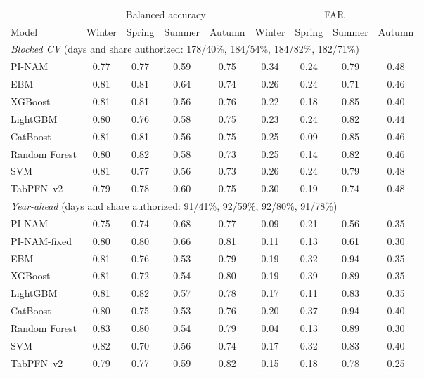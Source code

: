 \begin{tabular}{lcccccccc}
\toprule
 & \multicolumn{4}{c}{Balanced accuracy} & \multicolumn{4}{c}{FAR} \\
\cmidrule(lr){2-5}\cmidrule(lr){6-9}
Model & Winter & Spring & Summer & Autumn & Winter & Spring & Summer & Autumn \\
\midrule
\multicolumn{9}{l}{\textit{Blocked CV} (days and share authorized: 178/40\%, 184/54\%, 184/82\%, 182/71\%)} \\
PI-NAM & 0.77 & 0.77 & 0.59 & 0.75 & 0.34 & 0.24 & 0.79 & 0.48 \\
EBM & 0.81 & 0.81 & 0.64 & 0.74 & 0.26 & 0.24 & 0.71 & 0.46 \\
XGBoost & 0.81 & 0.81 & 0.56 & 0.76 & 0.22 & 0.18 & 0.85 & 0.40 \\
LightGBM & 0.80 & 0.76 & 0.58 & 0.75 & 0.23 & 0.24 & 0.82 & 0.44 \\
CatBoost & 0.81 & 0.81 & 0.56 & 0.75 & 0.25 & 0.09 & 0.85 & 0.46 \\
Random Forest & 0.80 & 0.82 & 0.58 & 0.73 & 0.25 & 0.14 & 0.82 & 0.46 \\
SVM & 0.81 & 0.77 & 0.56 & 0.73 & 0.26 & 0.24 & 0.79 & 0.48 \\
TabPFN~v2 & 0.79 & 0.78 & 0.60 & 0.75 & 0.30 & 0.19 & 0.74 & 0.48 \\
\multicolumn{9}{l}{\textit{Year-ahead} (days and share authorized: 91/41\%, 92/59\%, 92/80\%, 91/78\%)} \\
PI-NAM & 0.75 & 0.74 & 0.68 & 0.77 & 0.09 & 0.21 & 0.56 & 0.35 \\
PI-NAM-fixed & 0.80 & 0.80 & 0.66 & 0.81 & 0.11 & 0.13 & 0.61 & 0.30 \\
EBM & 0.81 & 0.76 & 0.53 & 0.79 & 0.19 & 0.32 & 0.94 & 0.35 \\
XGBoost & 0.81 & 0.72 & 0.54 & 0.80 & 0.19 & 0.39 & 0.89 & 0.35 \\
LightGBM & 0.81 & 0.82 & 0.57 & 0.78 & 0.17 & 0.11 & 0.83 & 0.35 \\
CatBoost & 0.80 & 0.75 & 0.53 & 0.76 & 0.20 & 0.37 & 0.94 & 0.40 \\
Random Forest & 0.83 & 0.80 & 0.54 & 0.79 & 0.04 & 0.13 & 0.89 & 0.30 \\
SVM & 0.82 & 0.70 & 0.56 & 0.74 & 0.17 & 0.32 & 0.83 & 0.40 \\
TabPFN~v2 & 0.79 & 0.77 & 0.59 & 0.82 & 0.15 & 0.18 & 0.78 & 0.25 \\
\bottomrule
\end{tabular}
